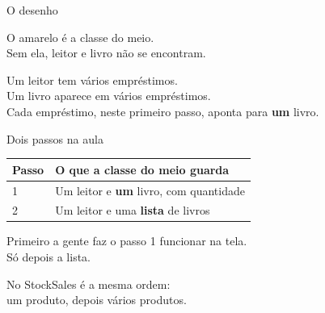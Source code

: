 \documentclass[aspectratio=169,11pt]{beamer}
\begin{document}
\begin{frame}{O desenho}
  \begin{center}
  \end{center}

  \vspace{0.6em}
  O amarelo é a classe do meio.\\
  Sem ela, leitor e livro não se encontram.

  \vspace{0.4em}
  Um leitor tem vários empréstimos.\\
  Um livro aparece em vários empréstimos.\\
  Cada empréstimo, neste primeiro passo, aponta para \textbf{um} livro.
\end{frame}

\begin{frame}{Dois passos na aula}
  \begin{center}
  \begin{tabular}{ll}
    \toprule
    Passo & O que a classe do meio guarda \\
    \midrule
    1 & Um leitor e \textbf{um} livro, com quantidade \\
    2 & Um leitor e uma \textbf{lista} de livros \\
    \bottomrule
  \end{tabular}
  \end{center}

  \vspace{0.7em}
  Primeiro a gente faz o passo 1 funcionar na tela.\\
  Só depois a lista.

  \vspace{0.5em}
  No StockSales é a mesma ordem:\\
  um produto, depois vários produtos.
\end{frame}
\end{document}
